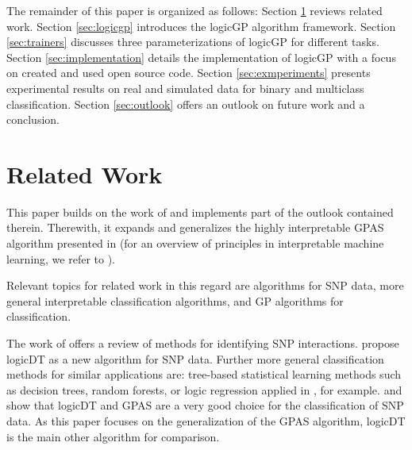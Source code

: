 \documentclass[dvipsnames,format=sigconf,anonymous=false,review=false]{acmart}
\begin{document}
The remainder of this paper is organized as follows: Section \ref{sec:relatedwork} reviews related work. Section \ref{sec:logicgp} introduces the logicGP algorithm framework. Section \ref{sec:trainers} discusses three parameterizations of logicGP for different tasks. Section \ref{sec:implementation} details the implementation of logicGP with a focus on created and used open source code. Section \ref{sec:exmperiments} presents experimental results on real and simulated data for binary and multiclass classification. Section \ref{sec:outlook} offers an outlook on future work and a conclusion.


\section{Related Work}\label{sec:relatedwork}

This paper builds on the work of \citet{Nunkesser2008b,bioinformatics24} and implements part of the outlook contained therein. Therewith, it expands and generalizes the highly interpretable GPAS algorithm presented in \citet{10.1093/bioinformatics/btm522} (for an overview of principles in interpretable machine learning, we refer to \citet{RudinEtAlSurvey2022}). %

Relevant topics for related work in this regard are algorithms for SNP data, more general interpretable classification algorithms, and GP algorithms for classification.


The work of \citet{5728791} offers a review of methods for identifying SNP interactions. \citet{lau_logicdt_2024} propose logicDT as a new algorithm for SNP data. Further more general classification methods for similar applications are:  tree-based statistical learning methods such as decision trees, random forests, or logic regression applied in \citet{https://doi.org/10.1002/gepi.20041,winham_snp_2012,RUCZINSKI2004178}, for example. \citet{lau_logicdt_2024} and \citet{bioinformatics24} show that logicDT and GPAS are a very good choice for the classification of SNP data. As this paper focuses on the generalization of the GPAS algorithm, logicDT is the main other algorithm for comparison.

\end{document}
